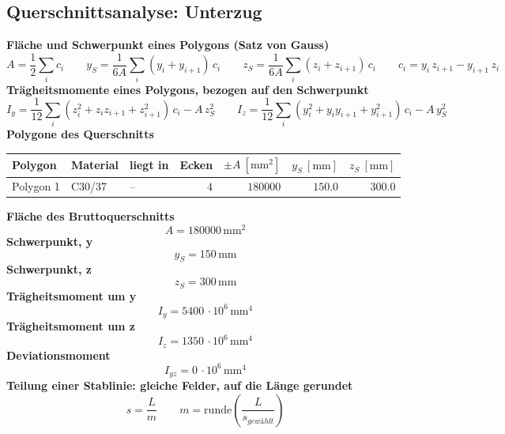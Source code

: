 \documentclass[11pt,a4paper]{article}
\begin{document}
\subsection{Querschnittsanalyse: Unterzug}
\noindent\textbf{Fläche und Schwerpunkt eines Polygons (Satz von Gauss)}
\begin{equation*}
A = \frac{1}{2} \sum_i c_i \qquad y_S = \frac{1}{6A} \sum_i (y_i + y_{i+1})\, c_i \qquad z_S = \frac{1}{6A} \sum_i (z_i + z_{i+1})\, c_i \qquad c_i = y_i\, z_{i+1} - y_{i+1}\, z_i
\end{equation*}
\noindent\textbf{Trägheitsmomente eines Polygons, bezogen auf den Schwerpunkt}
\begin{equation*}
I_y = \frac{1}{12} \sum_i (z_i^2 + z_i z_{i+1} + z_{i+1}^2)\, c_i - A\, z_S^2\qquad I_z = \frac{1}{12} \sum_i (y_i^2 + y_i y_{i+1} + y_{i+1}^2)\, c_i - A\, y_S^2
\end{equation*}
\noindent\textbf{Polygone des Querschnitts}
\begin{longtable}{lllrrrr}
\hline
Polygon & Material & liegt in & Ecken & $\pm A\ [\mathrm{mm}^2]$ & $y_S\ [\mathrm{mm}]$ & $z_S\ [\mathrm{mm}]$ \\
\hline
\endhead
Polygon 1 & C30/37 & – & $4$ & $180000$ & $150.0$ & $300.0$ \\
\hline
\end{longtable}
\noindent\textbf{Fläche des Bruttoquerschnitts}
\begin{equation*}
A = 180000\,\mathrm{mm}^{2}
\end{equation*}
\noindent\textbf{Schwerpunkt, y}
\begin{equation*}
y_S = 150\,\mathrm{mm}
\end{equation*}
\noindent\textbf{Schwerpunkt, z}
\begin{equation*}
z_S = 300\,\mathrm{mm}
\end{equation*}
\noindent\textbf{Trägheitsmoment um y}
\begin{equation*}
I_y = 5400\,\cdot 10^{6}\,\mathrm{mm}^{4}
\end{equation*}
\noindent\textbf{Trägheitsmoment um z}
\begin{equation*}
I_z = 1350\,\cdot 10^{6}\,\mathrm{mm}^{4}
\end{equation*}
\noindent\textbf{Deviationsmoment}
\begin{equation*}
I_{yz} = 0\,\cdot 10^{6}\,\mathrm{mm}^{4}
\end{equation*}
\noindent\textbf{Teilung einer Stablinie: gleiche Felder, auf die Länge gerundet}
\begin{equation*}
s = \frac{L}{m} \qquad m = \mathrm{runde}\left(\frac{L}{s_{gewählt}}\right)
\end{equation*}
\end{document}
